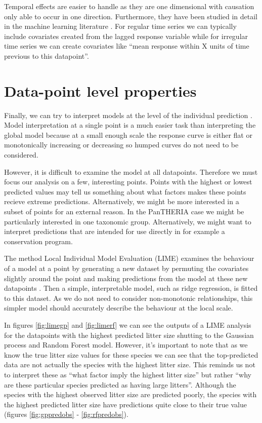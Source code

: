\documentclass[10pt,]{article}
\begin{document}
Temporal effects are easier to handle as they are one dimensional with causation only able to occur in one direction. Furthermore, they have been studied in detail in the machine learning literature \citep{jeong2008non}. For regular time series we can typically include covariates created from the lagged response variable while for irregular time series we can create covariates like ``mean response within X units of time previous to this datapoint''.

\section{Data-point level properties}\label{data-point-level-properties}

Finally, we can try to interpret models at the level of the individual prediction \citep{lime, ribeiro2016should, lundberg2017unified, ribeiro2016nothing}. Model interpretation at a single point is a much easier task than interpreting the global model because at a small enough scale the response curve is either flat or monotonically increasing or decreasing so humped curves do not need to be considered.

However, it is difficult to examine the model at all datapoints. Therefore we must focus our analysis on a few, interesting points. Points with the highest or lowest predicted values may tell us something about what factors makes these points recieve extreme predictions. Alternatively, we might be more interested in a subset of points for an external reason. In the PanTHERIA case we might be particularly interested in one taxonomic group. Alternatively, we might want to interpret predictions that are intended for use directly in for example a conservation program.

The method Local Individual Model Evaluation (LIME) examines the behaviour of a model at a point by generating a new dataset by permuting the covariates slightly around the point and making predictions from the model at these new datapoints \citep{lime, ribeiro2016should, lundberg2017unified, ribeiro2016nothing}. Then a simple, interpretable model, such as ridge regression, is fitted to this dataset. As we do not need to consider non-monotonic relationships, this simpler model should accurately describe the behaviour at the local scale.

In figures \ref{fig:limegp} and \ref{fig:limerf} we can see the outputs of a LIME analysis for the datapoints with the highest predicted litter size shutting to the Gaussian process and Random Forest model. However, it's important to note that as we know the true litter size values for these species we can see that the top-predicted data are not actually the species with the highest litter size. This reminds us not to interpret these as ``what factor imply the highest litter size'' but rather ``why are these particular species predicted as having large litters''. Although the species with the highest observed litter size are predicted poorly, the species with the highest predicted litter size have predictions quite close to their true value (figures \ref{fig:gppredobs} - \ref{fig:rfpredobs}).
\end{document}
